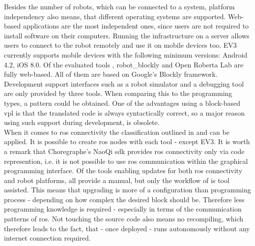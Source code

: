 Besides the number of robots, which can be connected to a system, platform independency also means, that different operating systems are supported. Web-based applications are the most independent ones, since users are not required to install software on their computers. Running the infrastructure on a server allows users to connect to the robot remotely and use it on mobile devices too. EV3 currently supports mobile devices with the following minimum versions: Android 4.2, iOS 8.0. Of the evaluated tools \toolname{}, robot\_blockly and Open Roberta Lab are fully web-based. All of them are based on Google's Blockly framework. \\

Development support interfaces such as a robot simulator and a debugging tool are only provided by three tools. When comparing this to the programming types, a pattern could be obtained. One of the advantages using a block-based \gls{vpl} is that the translated code is always syntactically correct, so a major reason using such support during development, is obsolete. \\

When it comes to \gls{ros} connectivity the classification outlined in  and  can be applied. It is possible to create \gls{ros} nodes with each tool - except EV3. It is worth a remark that Choregraphe's NaoQi \gls{sdk} provides \gls{ros} connectivity only via code represention, i.e. it is not possible to use \gls{ros} communication within the graphical programming interface. Of the tools enabling updates for both \gls{ros} connectivity and robot platforms, all provide a manual, but only the workflow of \toolname{} is tool assisted. This means that upgrading is more of a configuration than programming process - depending on how complex the desired block should be. Therefore less programming knowledge is required - especially in terms of the communication patterns of \gls{ros}. Not touching the source code also means no recompiling, which therefore leads to the fact, that - once deployed - \toolname{} runs autonomously without any internet connection required.

